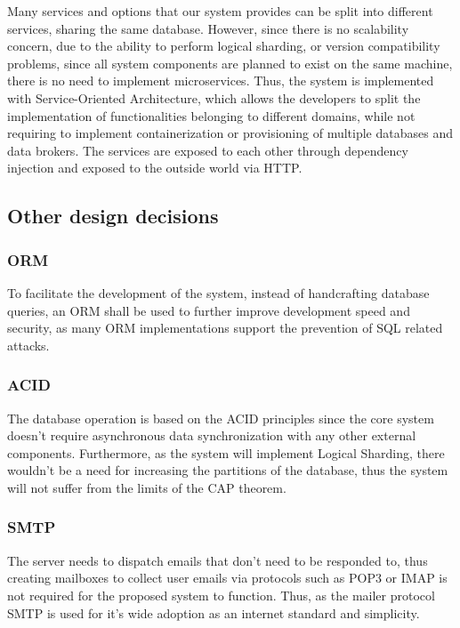
Many services and options that our system provides can be split into different services, sharing the same database.
However, since there is no scalability concern, due to the ability to perform logical sharding, or version compatibility problems, since all system components are planned to exist on the same machine, there is no need to implement microservices.
Thus, the system is implemented with Service-Oriented Architecture, which allows the developers to split the implementation of functionalities belonging to different domains, while not requiring to implement containerization or provisioning of multiple databases and data brokers.
The services are exposed to each other through dependency injection and exposed to the outside world via HTTP.

\subsection{Other design decisions} %

\subsubsection{ORM}
To facilitate the development of the system, instead of handcrafting database queries, an ORM shall be used to further improve development speed and security, as many ORM implementations support the prevention of SQL related attacks.

\subsubsection{ACID}

The database operation is based on the ACID principles since the core system doesn't require asynchronous data synchronization with any other external components.
Furthermore, as the system will implement Logical Sharding, there wouldn't be a need for increasing the partitions of the database, thus the system will not suffer from the limits of the CAP theorem.

\subsubsection{SMTP}
The server needs to dispatch emails that don't need to be responded to, thus creating mailboxes to collect user emails via protocols such as POP3 or IMAP is not required for the proposed system to function.
Thus, as the mailer protocol SMTP\cite{ietfsmtp} is used for it's wide adoption as an internet standard and simplicity.



